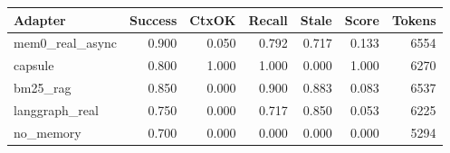 \begin{tabular}{lrrrrrr}
\hline
Adapter & Success & CtxOK & Recall & Stale & Score & Tokens \\
\hline
mem0\_real\_async & 0.900 & 0.050 & 0.792 & 0.717 & 0.133 & 6554 \\
capsule & 0.800 & 1.000 & 1.000 & 0.000 & 1.000 & 6270 \\
bm25\_rag & 0.850 & 0.000 & 0.900 & 0.883 & 0.083 & 6537 \\
langgraph\_real & 0.750 & 0.000 & 0.717 & 0.850 & 0.053 & 6225 \\
no\_memory & 0.700 & 0.000 & 0.000 & 0.000 & 0.000 & 5294 \\
\hline
\end{tabular}
